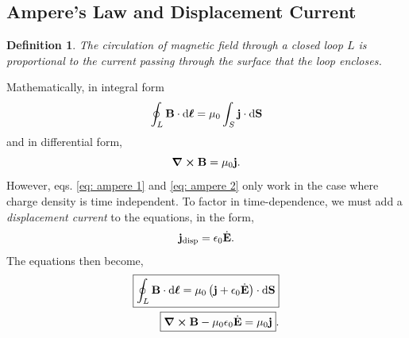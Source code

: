 \documentclass{book}
\newtheorem*{definition}{Definition}
\begin{document}
\subsection{Ampere's Law and Displacement Current}
\begin{definition}
	The circulation of magnetic field through a closed loop $L$  is proportional to the current passing through the surface that the loop encloses.
\end{definition}
Mathematically, in integral form
\begin{equation}
	\oint_L \vb{B}\cdot\dd{\vb*{\ell}} = \mu_0 \int_S \vb{j}\cdot\dd{\vb{S}} \label{eq: ampere 1}
\end{equation}
and in differential form,
\begin{equation}
	\curl{\vb{B}} =\mu_0 \vb{j}. \label{eq: ampere 2}
\end{equation}
However, eqs. \eqref{eq: ampere 1} and \eqref{eq: ampere 2} only work in the case where charge density is time independent. To factor in time-dependence, we must add a \textit{displacement current} to the equations, in the form,
\begin{equation}
	\vb{j}_{\text{disp}} = \epsilon_{0} \Dot{\vb{E}}.
\end{equation}
The equations then become,
\begin{align}
	\boxed{\oint_L \vb{B}\cdot\dd{\vb*{\ell}} = \mu_0 \left(\vb{j} + \epsilon_0\Dot{\vb{E}}\right)\cdot\dd{\vb{S}}} \\
	\boxed{\curl{\vb{B}} - \mu_0\epsilon_{0}\Dot{\vb{E}} = \mu_0\vb{j}}.
\end{align}
\end{document}
